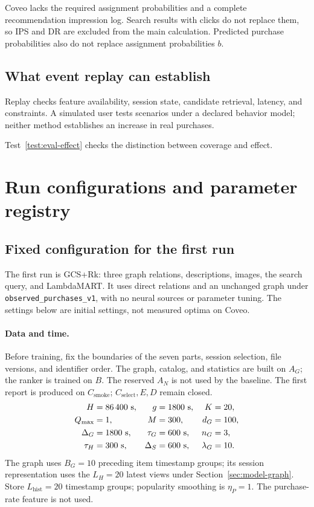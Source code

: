 \documentclass[12pt,a4paper]{article}
\newcommand{\code}[1]{{\ttfamily\small\nolinkurl{#1}}}
\theoremstyle{plainru}
\begin{document}
Coveo lacks the required assignment probabilities and a complete recommendation
impression log. Search results with clicks do not replace them, so IPS
and DR are excluded from the main calculation. Predicted purchase probabilities
also do not replace assignment probabilities $b$.

\subsection{What event replay can establish}
\label{sec:eval-replay}

Replay checks feature availability, session state,
candidate retrieval, latency, and constraints. A simulated user
tests scenarios under a declared behavior model; neither method
establishes an increase in real purchases.

Test~\ref{test:eval-effect} checks the distinction between coverage and effect.


\section{Run configurations and parameter registry}\label{app:parameters}

\subsection{Fixed configuration for the first run}\label{app:first-config}

The first run is GCS+Rk: three graph relations, descriptions, images,
the search query, and LambdaMART. It uses direct relations and an unchanged
graph under \code{observed_purchases_v1}, with no neural
sources or parameter tuning. The settings below are
initial settings, not measured optima on Coveo.

\paragraph{Data and time.}
Before training, fix the boundaries of the seven parts, session selection,
file versions, and identifier order. The graph, catalog, and statistics
are built on $A_G$; the ranker is trained on $B$. The reserved $A_N$
is not used by the baseline. The first report is produced on $C_{\mathrm{smoke}}$;
$C_{\mathrm{select}},E,D$ remain closed.
\begin{align}
H&=86\,400\ \text{s},&g&=1800\ \text{s},&K&=20,\notag\\
Q_{\max}&=1,&M&=300,&d_G&=100,\notag\\
\Delta_G&=1800\ \text{s},&\tau_G&=600\ \text{s},&n_G&=3,\notag\\
\tau_H&=300\ \text{s},&\Delta_S&=600\ \text{s},&\lambda_G&=10.
\label{eq:app-start}
\end{align}
The graph uses $B_G=10$ preceding item timestamp groups;
its session representation uses the $L_H=20$ latest views
under Section~\ref{sec:model-graph}. Store $L_{\mathrm{hist}}=20$
timestamp groups; popularity smoothing is $\eta_P=1$.
The purchase-rate feature is not used.
\end{document}
